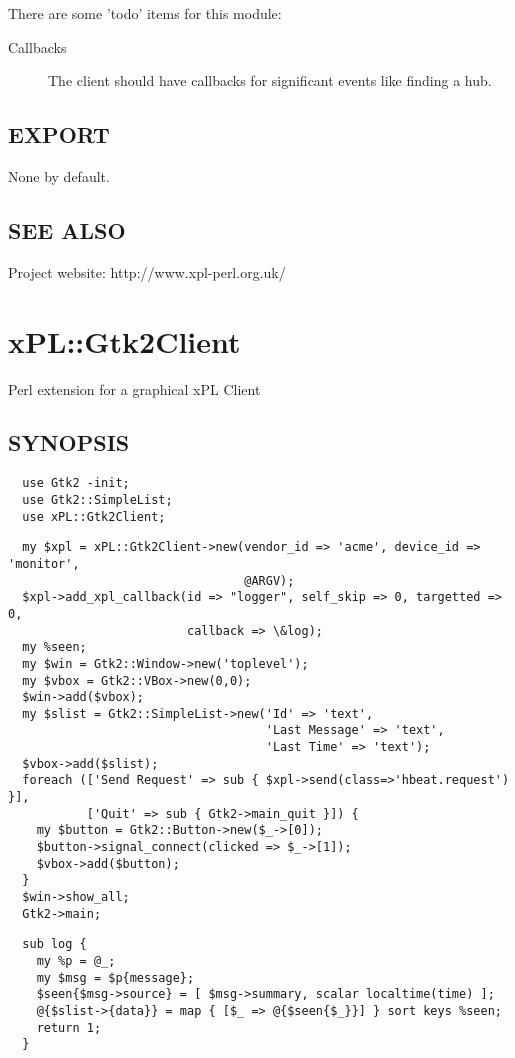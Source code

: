There are some 'todo' items for this module:

\begin{description}

\item[{Callbacks}] \mbox{}

The client should have callbacks for significant events like finding a
hub.

\end{description}
\subsection*{EXPORT\label{xPL::Client_EXPORT}}


None by default.

\subsection*{SEE ALSO\label{xPL::Client_SEE_ALSO}}


Project website: http://www.xpl-perl.org.uk/

\section{xPL::Gtk2Client\label{xPL::Gtk2Client}}


Perl extension for a graphical xPL Client

\subsection*{SYNOPSIS\label{xPL::Gtk2Client_SYNOPSIS}}
\begin{verbatim}
  use Gtk2 -init;
  use Gtk2::SimpleList;
  use xPL::Gtk2Client;
\end{verbatim}
\begin{verbatim}
  my $xpl = xPL::Gtk2Client->new(vendor_id => 'acme', device_id => 'monitor',
                                 @ARGV);
  $xpl->add_xpl_callback(id => "logger", self_skip => 0, targetted => 0,
                         callback => \&log);
  my %seen;
  my $win = Gtk2::Window->new('toplevel');
  my $vbox = Gtk2::VBox->new(0,0);
  $win->add($vbox);
  my $slist = Gtk2::SimpleList->new('Id' => 'text',
                                    'Last Message' => 'text',
                                    'Last Time' => 'text');
  $vbox->add($slist);
  foreach (['Send Request' => sub { $xpl->send(class=>'hbeat.request') }],
           ['Quit' => sub { Gtk2->main_quit }]) {
    my $button = Gtk2::Button->new($_->[0]);
    $button->signal_connect(clicked => $_->[1]);
    $vbox->add($button);
  }
  $win->show_all;
  Gtk2->main;
\end{verbatim}
\begin{verbatim}
  sub log {
    my %p = @_;
    my $msg = $p{message};
    $seen{$msg->source} = [ $msg->summary, scalar localtime(time) ];
    @{$slist->{data}} = map { [$_ => @{$seen{$_}}] } sort keys %seen;
    return 1;
  }
\end{verbatim}
